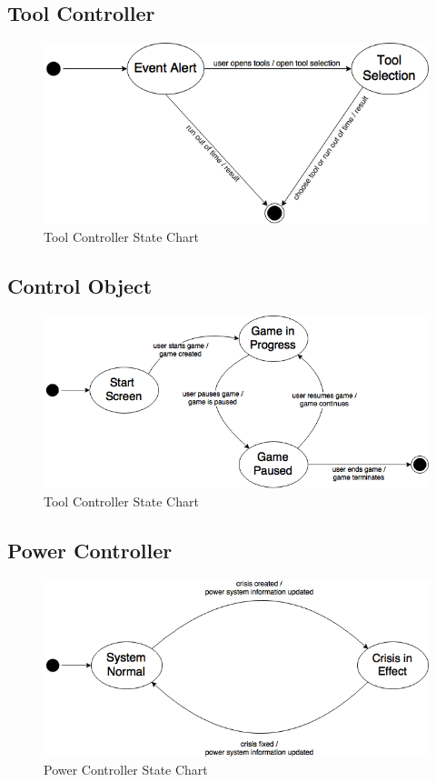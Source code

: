 \documentclass[12pt, titlepage]{article}
\begin{document}
\subsection{Tool Controller}
\begin{figure}[H]
\centering
\includegraphics[width=120mm]{ToolController.png}
\caption{Tool Controller State Chart}
\end{figure}

\subsection{Control Object}
\begin{figure}[H]
\centering
\includegraphics[width=120mm]{ControlObject.png}
\caption{Tool Controller State Chart}
\end{figure}

\subsection{Power Controller}
\begin{figure}[H]
\centering
\includegraphics[width=120mm]{PowerController.png}
\caption{Power Controller State Chart}
\end{figure}
\end{document}
